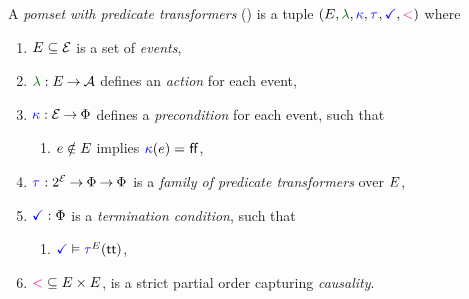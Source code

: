 \begin{definition}
  \label{def:pomset}
  A \emph{pomset with predicate transformers} (\PwT) %
  is a tuple $(\aEvs, \labeling, \labelingForm, \aTr{}{}, \aTerm, {\lt})$ where
  \begin{enumerate}[,label=(\textsc{m}\arabic*),ref=\textsc{m}\arabic*]
  \item \label{pom-E} 
    $E\subseteq\mathcal{E}$ is a set of \emph{events},
  \item \label{pom-lambda} 
    $\labeling: \aEvs \fun \Act$ defines an \emph{action} for each event,
  \item \label{pom-kappa} 
    ${\color{blue}\kappa}:\mathcal{E}\mathbin\rightarrow\Phi$ defines a \emph{precondition} for each event,
    such that
    \begin{enumerate}
    \item \label{pom-kappa-sat}
      $e\notin E$ implies ${\color{blue}\kappa}(e)=\mkern.6mu\mathsf{ff}\mkern.6mu$,
    \end{enumerate}
  \item \label{pom-tau} 
    $\aTr{}{}:2^{\AllEvents}\fun\Formulae \fun\Formulae$ is a \emph{family of predicate transformers} over $E$, 
  \item \label{pom-term} 
    $\aTerm:\Formulae$ is a \emph{termination condition}, such that 
    \begin{enumerate}
    \item \label{pom-term-tau}
      $\aTerm\rimplies\aTrAbbrv{\aEvs}{\TRUE}$,
    \end{enumerate}
  \item \label{pom-le} 
    ${\mathrel{{\color{magenta}<}}} \subseteq E\times E$, is a strict partial order capturing
    \emph{causality}.

\end{enumerate}
\end{definition}
